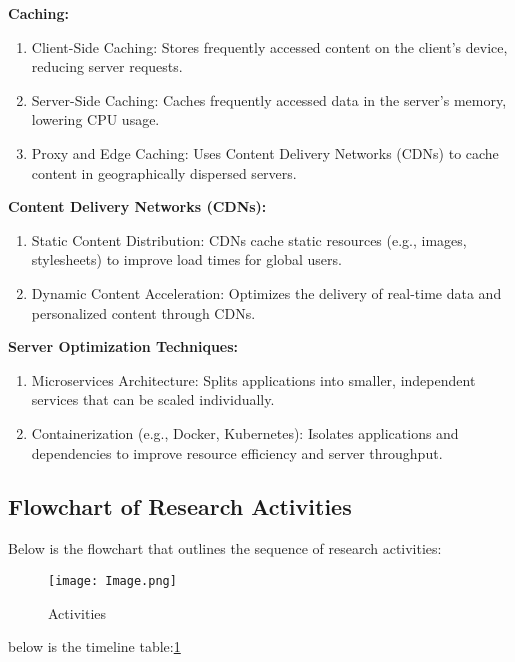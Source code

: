 \documentclass[a4paper, 12pt]{article}
\begin{document}
\textbf{Caching:}
\begin{enumerate}
    \item Client-Side Caching: Stores frequently accessed content on the client’s device, reducing server requests.
    \item Server-Side Caching: Caches frequently accessed data in the server's memory, lowering CPU usage.
    \item Proxy and Edge Caching: Uses Content Delivery Networks (CDNs) to cache content in geographically dispersed servers.
    
\end{enumerate}


\textbf{Content Delivery Networks (CDNs):}
\begin{enumerate}
    \item Static Content Distribution: CDNs cache static resources (e.g., images, stylesheets) to improve load times for global users.
    \item Dynamic Content Acceleration: Optimizes the delivery of real-time data and personalized content through CDNs.
    
\end{enumerate}

\textbf{Server Optimization Techniques:}

\begin{enumerate}
    \item Microservices Architecture: Splits applications into smaller, independent services that can be scaled individually.
    \item Containerization (e.g., Docker, Kubernetes): Isolates applications and dependencies to improve resource efficiency and server throughput.
\end{enumerate}

\subsection{Flowchart of Research Activities}
Below is the flowchart that outlines the sequence of research activities:\\

\begin{figure}[h]
    \centering
    \texttt{[image: Image.png]}
    \caption{Activities}
    \label{fig:enter-label}
\end{figure}
below is the timeline table:\ref{fig:enter-label}
\end{document}
